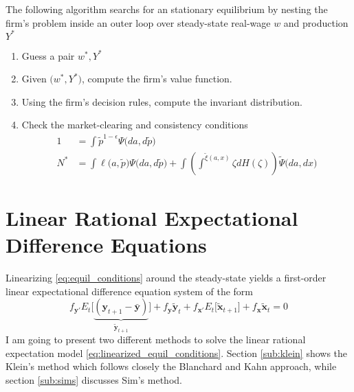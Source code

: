 \documentclass[a4paper,10pt]{article}  %
\begin{document}
The following algorithm searchs for an stationary equilibrium by nesting the firm's problem inside an outer loop over steady-state
real-wage $w$ and production $ Y^* $
\begin{enumerate}
   
   \item Guess a pair $ w^*,Y^* $
   \item Given $ \Big(w^*,Y^* \Big) $, compute the firm's value function.
   \item Using the firm's decision rules, compute the invariant distribution.
   \item Check the market-clearing and consistency conditions
      \begin{align*}
         1 & = \int \tilde{p}^{1-\epsilon} \Psi\big(da, d\tilde{p} \big) \\
         N^* & = 
         \int \ell \big( a, \tilde{p} \big) \Psi \big(da,d\tilde{p} \big) + 
         \int \left( \int^{\tilde{\xi}( a, x) } \zeta dH( \zeta) \right) \widetilde{\Psi} \big( da,dx \big)
      \end{align*}
\end{enumerate}




\newpage
\section{Linear Rational Expectational Difference Equations} %
\label{sec:linear_rational_expectational_difference_equations}

Linearizing \eqref{eq:equil_conditions} around the steady-state yields a first-order linear expectational difference
equation system of the form
\begin{equation}
   \label{eq:linearized_equil_conditions}
   f_{ \mathbf{y}' } E_t \Big[ \underbrace{ ( \mathbf{y}_{t+1} -  \bar{\mathbf{y}}) }_{ \tilde{\mathbf{y}}_{t+1} } \Big] 
   + f_{ \mathbf{y} }   \tilde{\mathbf{y}}_t  
   + f_{ \mathbf{x}' }  E_t \Big[  \tilde{\mathbf{x}}_{t+1} \Big]
   + f_{ \mathbf{x} }   \tilde{\mathbf{x}}_{t}
   = 0
\end{equation}
I am going to present two different methods to solve the linear rational expectation model \eqref{eq:linearized_equil_conditions}.
Section \ref{sub:klein} shows the Klein's method which follows closely the Blanchard and Kahn approach, while section \ref{sub:sims}
discusses Sim's method.
\end{document}
